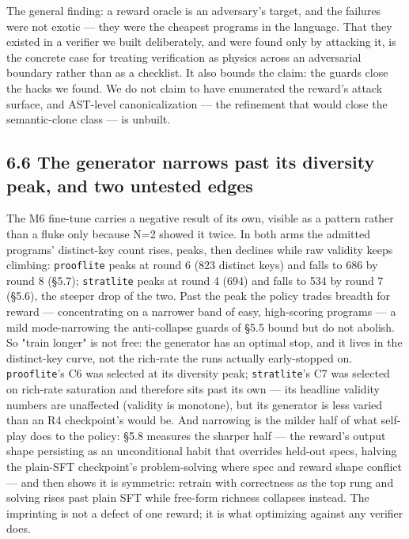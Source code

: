\documentclass[11pt]{article}
\newcommand{\code}[1]{\texttt{#1}}
\begin{document}
The general finding: a reward oracle is an adversary's target, and the failures
were not exotic --- they were the cheapest programs in the language. That they
existed in a verifier we built deliberately, and were found only by attacking
it, is the concrete case for treating verification as physics across an
adversarial boundary rather than as a checklist. It also bounds the claim: the
guards close the hacks we found. We do not claim to have enumerated the reward's
attack surface, and AST-level canonicalization --- the refinement that would close
the semantic-clone class --- is unbuilt.

\subsection*{6.6 The generator narrows past its diversity peak, and two untested edges}

The M6 fine-tune carries a negative result of its own, visible as a pattern
rather than a fluke only because N=2 showed it twice. In both arms the admitted
programs' distinct-key count rises, peaks, then declines while raw validity keeps
climbing: \code{prooflite} peaks at round 6 (823 distinct keys) and falls to 686 by
round 8 (\S{}5.7); \code{stratlite} peaks at round 4 (694) and falls to 534 by round 7
(\S{}5.6), the steeper drop of the two. Past the peak the policy trades breadth for
reward --- concentrating on a narrower band of easy, high-scoring programs --- a mild
mode-narrowing the anti-collapse guards of \S{}5.5 bound but do not abolish. So
"train longer" is not free: the generator has an optimal stop, and it lives in
the distinct-key curve, not the rich-rate the runs actually early-stopped on.
\code{prooflite}'s C6 was selected at its diversity peak; \code{stratlite}'s C7 was
selected on rich-rate saturation and therefore sits past its own --- its headline
validity numbers are unaffected (validity is monotone), but its generator is
less varied than an R4 checkpoint's would be. And narrowing is the milder half
of what self-play does to the policy: \S{}5.8 measures the sharper half --- the
reward's output shape persisting as an unconditional habit that overrides
held-out specs, halving the plain-SFT checkpoint's problem-solving where spec
and reward shape conflict --- and then shows it is symmetric: retrain with
correctness as the top rung and solving rises past plain SFT while free-form
richness collapses instead. The imprinting is not a defect of one reward; it
is what optimizing against any verifier does.
\end{document}
